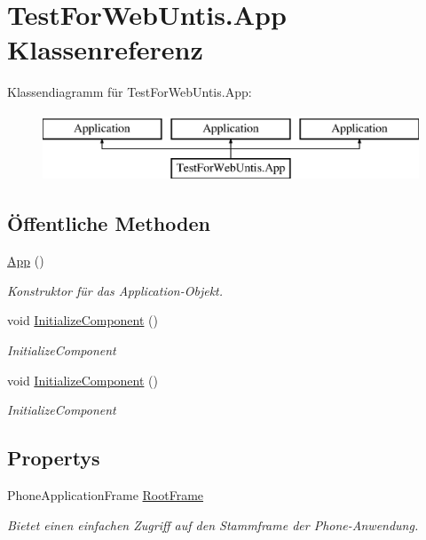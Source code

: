\hypertarget{class_test_for_web_untis_1_1_app}{\section{Test\-For\-Web\-Untis.\-App Klassenreferenz}
\label{class_test_for_web_untis_1_1_app}
}
Klassendiagramm für Test\-For\-Web\-Untis.\-App\-:\begin{figure}[H]
\begin{center}
\leavevmode
\includegraphics[height=2.000000cm]{class_test_for_web_untis_1_1_app}
\end{center}
\end{figure}
\subsection*{Öffentliche Methoden}
\begin{DoxyCompactItemize}
\item 
\hyperlink{class_test_for_web_untis_1_1_app_a1cfa227a9beb595ed54f345673442556}{App} ()
\begin{DoxyCompactList}\small\item\em Konstruktor für das Application-\/\-Objekt. \end{DoxyCompactList}\item 
void \hyperlink{class_test_for_web_untis_1_1_app_a010a481103b741a79d7b6d3e4bf36efd}{Initialize\-Component} ()
\begin{DoxyCompactList}\small\item\em Initialize\-Component \end{DoxyCompactList}\item 
void \hyperlink{class_test_for_web_untis_1_1_app_a010a481103b741a79d7b6d3e4bf36efd}{Initialize\-Component} ()
\begin{DoxyCompactList}\small\item\em Initialize\-Component \end{DoxyCompactList}\end{DoxyCompactItemize}
\subsection*{Propertys}
\begin{DoxyCompactItemize}
\item 
Phone\-Application\-Frame \hyperlink{class_test_for_web_untis_1_1_app_a3de6c087bb9af076ec1ee6eaf47f5cfa}{Root\-Frame}
\begin{DoxyCompactList}\small\item\em Bietet einen einfachen Zugriff auf den Stammframe der Phone-\/\-Anwendung. \end{DoxyCompactList}\end{DoxyCompactItemize}


